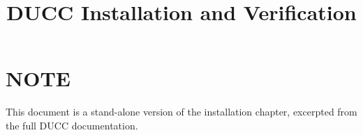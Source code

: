 \documentclass[letterpaper]{article}
\title{DUCC Installation and Verification}
\date{}
\begin{document}
\maketitle

\newpage

\section{NOTE}
This document is a stand-alone version of the installation chapter, excerpted
from the full DUCC documentation.



\end{document}
